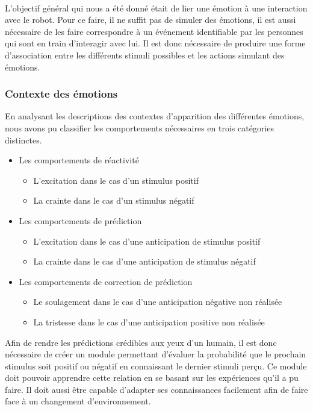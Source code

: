 \paragraph{}
L'objectif général qui nous a été donné était de lier une émotion à une
interaction avec le robot. Pour ce faire, il ne suffit pas de simuler des
émotions, il est aussi nécessaire de les faire correspondre à un événement
identifiable par les personnes qui sont en train d'interagir avec lui. Il est
donc nécessaire de produire une forme d'association entre les différents
stimuli possibles et les actions simulant des émotions.

\subsubsection{Contexte des émotions}
En analysant les descriptions des contextes d'apparition des différentes
émotions, nous avons pu classifier les comportements nécessaires en trois
catégories distinctes.
\begin{itemize}
\item Les comportements de réactivité
      \begin{itemize}
      \item L'excitation dans le cas d'un stimulus positif
      \item La crainte dans le cas d'un stimulus négatif
      \end{itemize}
\item Les comportements de prédiction
      \begin{itemize}
      \item L'excitation dans le cas d'une anticipation de stimulus positif
      \item La crainte dans le cas d'une anticipation de stimulus négatif
      \end{itemize}
\item Les comportements de correction de prédiction
      \begin{itemize}
      \item Le soulagement dans le cas d'une anticipation négative non réalisée
      \item La tristesse dans le cas d'une anticipation positive non réalisée
      \end{itemize}
\end{itemize}

Afin de rendre les prédictions crédibles aux yeux d'un humain, il est
donc nécessaire de créer un module permettant d'évaluer la probabilité que le
prochain stimulus soit positif ou négatif en connaissant le dernier stimuli
perçu. Ce module doit pouvoir apprendre cette relation en se basant sur les
expériences qu'il a pu faire. Il doit aussi être capable d'adapter ses
connaissances facilement afin de faire face à un changement d'environnement.

